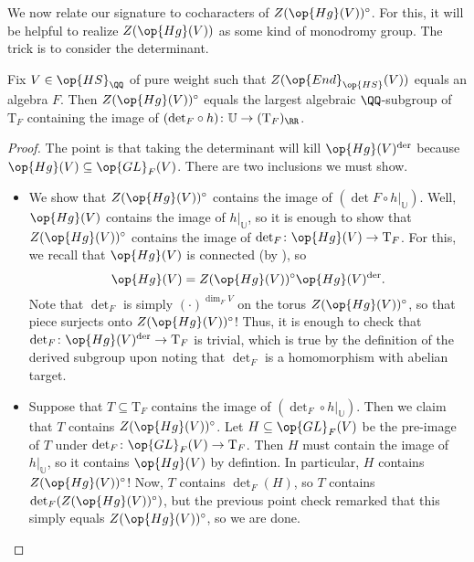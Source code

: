 \documentclass[../thesis.tex]{subfiles}
\begin{document}
We now relate our signature to cocharacters of $Z(\op{Hg}(V))^\circ$. For this, it will be helpful to realize $Z(\op{Hg}(V))$ as some kind of monodromy group. The trick is to consider the determinant.
\begin{lemma} \label{lem:z-hg-as-det-monodromy}
	Fix $V\in\op{HS}_\QQ$ of pure weight such that $Z(\op{End}_{\op{HS}}(V))$ equals an algebra $F$. Then $Z(\op{Hg}(V))^\circ$ equals the largest algebraic $\QQ$-subgroup of $\mathrm T_F$ containing the image of $({\det_F}\circ h)\colon\mathbb U\to(\mathrm T_F)_\RR$.
\end{lemma}
\begin{proof}
	The point is that taking the determinant will kill $\op{Hg}(V)^{\mathrm{der}}$ because $\op{Hg}(V)\subseteq\op{GL}_F(V)$. There are two inclusions we must show.
	\begin{itemize}
		\item We show that $Z(\op{Hg}(V))^\circ$ contains the image of $({\det F}\circ h|_{\mathbb U})$. Well, $\op{Hg}(V)$ contains the image of $h|_{\mathbb U}$, so it is enough to show that $Z(\op{Hg}(V))^\circ$ contains the image of $\det_F\colon\op{Hg}(V)\to\mathrm T_F$. For this, we recall that $\op{Hg}(V)$ is connected (by ), so
		\[\op{Hg}(V)=Z(\op{Hg}(V))^\circ\op{Hg}(V)^{\mathrm{der}}.\]
		Note that $\det_F$ is simply $(\cdot)^{\dim_FV}$ on the torus $Z(\op{Hg}(V))^\circ$, so that piece surjects onto $Z(\op{Hg}(V))^\circ$! Thus, it is enough to check that $\det_F\colon\op{Hg}(V)^{\mathrm{der}}\to\mathrm T_F$ is trivial, which is true by the definition of the derived subgroup upon noting that $\det_F$ is a homomorphism with abelian target.
		\item Suppose that $T\subseteq\mathrm T_F$ contains the image of $({\det_F}\circ h|_{\mathbb U})$. Then we claim that $T$ contains $Z(\op{Hg}(V))^\circ$. Let $H\subseteq\op{GL}_F(V)$ be the pre-image of $T$ under $\det_F\colon\op{GL}_F(V)\to\mathrm T_F$. Then $H$ must contain the image of $h|_{\mathbb U}$, so it contains $\op{Hg}(V)$ by defintion. In particular, $H$ contains $Z(\op{Hg}(V))^\circ$! Now, $T$ contains $\det_F(H)$, so $T$ contains $\det_F(Z(\op{Hg}(V))^\circ)$, but the previous point check remarked that this simply equals $Z(\op{Hg}(V))^\circ$, so we are done.
		\qedhere
	\end{itemize}
\end{proof}
\end{document}
